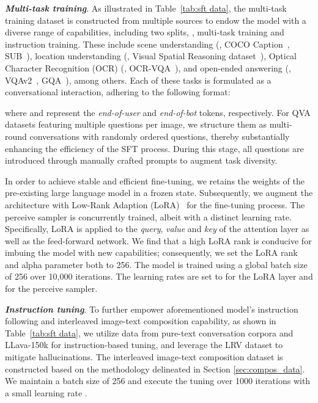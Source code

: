 \documentclass[10pt,twocolumn,letterpaper]{article}
\begin{document}
\textbf{\emph{Multi-task training}}. As illustrated in Table~\ref{tab:sft data}, the multi-task training dataset is constructed from multiple sources to endow the model with a diverse range of capabilities, including two splits, \ie, multi-task training and instruction training.
These include scene understanding (\eg, COCO Caption~\cite{chen2015microsoft}, SUB~\cite{Ordonez_2011_im2text}), location understanding (\eg, Visual Spatial Reasoning dataset~\cite{Liu2022VisualSR}), Optical Character Recognition (OCR) (\eg, OCR-VQA~\cite{mishraICDAR19}), and open-ended answering (\eg, VQAv2~\cite{VQAv2}, GQA~\cite{hudson2018gqa}), among others. Each of these tasks is formulated as a conversational interaction, adhering to the following format:

where  and  represent the \textit{end-of-user} and \textit{end-of-bot} tokens, respectively. For QVA datasets featuring multiple questions per image, we structure them as multi-round conversations with randomly ordered questions, thereby substantially enhancing the efficiency of the SFT process. During this stage, all questions are introduced through manually crafted prompts to augment task diversity. 


In order to achieve stable and efficient fine-tuning, we retains the weights of the pre-existing large language model in a frozen state. Subsequently, we augment the architecture with Low-Rank Adaption (LoRA)~\cite  {hu2022lora} for the fine-tuning process. The perceive sampler is concurrently trained, albeit with a distinct learning rate. Specifically, LoRA is applied to the \textit{query}, \textit{value} and \textit{key} of the attention layer as well as the feed-forward network. We find that a high LoRA rank is conducive for imbuing the model with new capabilities; consequently, we set the LoRA rank and alpha parameter both to 256. The model is trained using a global batch size of 256 over 10,000 iterations. The learning rates are set to  for the LoRA layer and  for the perceive sampler.

\textbf{\emph{Instruction tuning}}. To further empower aforementioned model's instruction following and interleaved image-text composition capability, as shown in Table~\ref{tab:sft data}, we utilize data from pure-text conversation corpora and LLava-150k for instruction-based tuning, and leverage the LRV dataset to mitigate hallucinations. The interleaved image-text composition dataset is constructed based on the methodology delineated in Section \ref{sec:compos_data}. We maintain a batch size of 256 and execute the tuning over 1000 iterations with a small learning rate .
\end{document}
